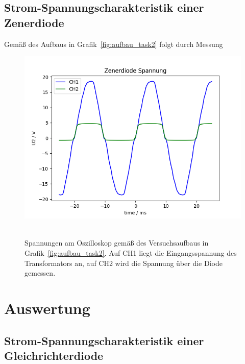 \documentclass{article}
\begin{document}
\subsection{Strom-Spannungscharakteristik einer Zenerdiode}

Gemäß des Aufbaus in Grafik~\ref{fig:aufbau_task2} folgt durch Messung


\begin{figure}[H]
\caption{Spannungen am Oszilloskop gemäß des Versuchsaufbaus in Grafik~\ref{fig:aufbau_task2}. Auf CH1 liegt die Eingangsspannung des Transformators an, auf CH2 wird die Spannung über die Diode gemessen.}
\label{fig:grafik_task2}
{\centering
\includegraphics[scale=0.7]{bilder/task2.png}
~
}
\end{figure}



\section{Auswertung}

\subsection{Strom-Spannungscharakteristik einer Gleichrichterdiode}
\end{document}

